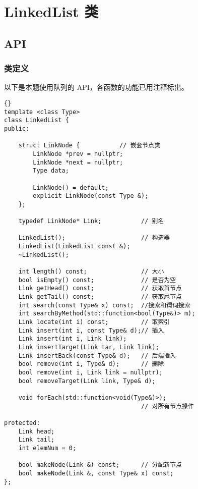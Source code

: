 \chapter{LinkedList 类}

\section{API}

\subsection{类定义}
以下是本题使用队列的 API，各函数的功能已用注释标出。
\begin{lstlisting}[morendkeywords={LinkedList}, firstnumber=637, caption=LinkedList 类定义]{}
template <class Type>
class LinkedList {
public:

    struct LinkNode {           // 嵌套节点类
        LinkNode *prev = nullptr;
        LinkNode *next = nullptr;
        Type data;

        LinkNode() = default;
        explicit LinkNode(const Type &);
    };

    typedef LinkNode* Link;           // 别名

    LinkedList();                     // 构造器
    LinkedList(LinkedList const &);
    ~LinkedList();

    int length() const;               // 大小
    bool isEmpty() const;             // 是否为空
    Link getHead() const;             // 获取首节点
    Link getTail() const;             // 获取尾节点
    int search(const Type& x) const;  //搜索和谓词搜索
    int searchByMethod(std::function<bool(Type&)> m);
    Link locate(int i) const;         // 取索引
    Link insert(int i, const Type& d);// 插入
    Link insert(int i, Link link);    
    Link insertTarget(Link tar, Link link);
    Link insertBack(const Type& d);   // 后端插入
    bool remove(int i, Type& d);      // 删除
    bool remove(int i, Link link = nullptr);
    bool removeTarget(Link link, Type& d);

    void forEach(std::function<void(Type&)>);
                                      // 对所有节点操作 

protected:
    Link head;
    Link tail;
    int elemNum = 0;

    bool makeNode(Link &) const;      // 分配新节点
    bool makeNode(Link &, const Type& x) const;
};
\end{lstlisting}
\vspace*{1cm}

